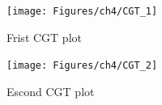 










\begin{figure}
\centering
\noindent\texttt{[image: Figures/ch4/CGT\_1]}
\caption{Frist CGT plot}
\label{fig:cgt1}
\end{figure}

\begin{figure}
\centering
\noindent\texttt{[image: Figures/ch4/CGT\_2]}
\caption{Escond CGT plot}
\label{fig:cgt2}
\end{figure}

